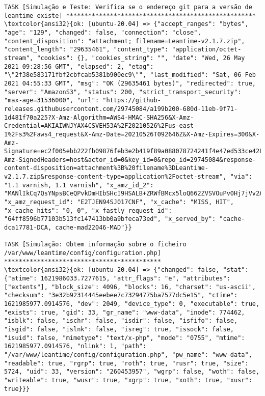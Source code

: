 \documentclass{scrartcl}
\begin{document}
\begin{Verbatim}
TASK [Simulação e Teste: Verifica se o endereço git para a versão de leantime existe] ****************************************************
\textcolor{ansi32}{ok: [ubuntu-20.04] => {"accept_ranges": "bytes", "age": "129", "changed": false, "connection": "close", "content_disposition": "attachment; filename=Leantime-v2.1.7.zip", "content_length": "29635461", "content_type": "application/octet-stream", "cookies": {}, "cookies_string": "", "date": "Wed, 26 May 2021 09:28:56 GMT", "elapsed": 2, "etag": "\"2f38e583171fbf2cbfcab5381b900ec9\"", "last_modified": "Sat, 06 Feb 2021 04:55:33 GMT", "msg": "OK (29635461 bytes)", "redirected": true, "server": "AmazonS3", "status": 200, "strict_transport_security": "max-age=31536000", "url": "https://github-releases.githubusercontent.com/29745084/a199b200-680d-11eb-9f71-1d481f70a225?X-Amz-Algorithm=AWS4-HMAC-SHA256&X-Amz-Credential=AKIAIWNJYAX4CSVEH53A%2F20210526%2Fus-east-1%2Fs3%2Faws4_request&X-Amz-Date=20210526T092646Z&X-Amz-Expires=300&X-Amz-Signature=ec2f005ebb222fb09876feb3e2b419f89a088078724241f4e47ed533ce4281be&X-Amz-SignedHeaders=host&actor_id=0&key_id=0&repo_id=29745084&response-content-disposition=attachment%3B%20filename%3DLeantime-v2.1.7.zip&response-content-type=application%2Foctet-stream", "via": "1.1 varnish, 1.1 varnish", "x_amz_id_2": "MANlIkCq7QsYNpsBCeQPvkDmHIbSHcI9HSALB+ZRWfBMcx5loQ662ZVSVOuPv0Hj7jVv2Anm3wg=", "x_amz_request_id": "E2TJEN94SJ017CNF", "x_cache": "MISS, HIT", "x_cache_hits": "0, 0", "x_fastly_request_id": "64ff8596b77103b513fc147413bb0a9bfeca73ed", "x_served_by": "cache-dca17781-DCA, cache-mad22046-MAD"}}

TASK [Simulação: Obtem informação sobre o ficheiro /var/www/leantime/config/configuration.php] *******************************************
\textcolor{ansi32}{ok: [ubuntu-20.04] => {"changed": false, "stat": {"atime": 1621986033.7277615, "attr_flags": "e", "attributes": ["extents"], "block_size": 4096, "blocks": 16, "charset": "us-ascii", "checksum": "3e32b92314445eebee7c73294775ba7577dc5e15", "ctime": 1621985977.0914576, "dev": 2049, "device_type": 0, "executable": true, "exists": true, "gid": 33, "gr_name": "www-data", "inode": 774462, "isblk": false, "ischr": false, "isdir": false, "isfifo": false, "isgid": false, "islnk": false, "isreg": true, "issock": false, "isuid": false, "mimetype": "text/x-php", "mode": "0755", "mtime": 1621985977.0914576, "nlink": 1, "path": "/var/www/leantime/config/configuration.php", "pw_name": "www-data", "readable": true, "rgrp": true, "roth": true, "rusr": true, "size": 5724, "uid": 33, "version": "260453957", "wgrp": false, "woth": false, "writeable": true, "wusr": true, "xgrp": true, "xoth": true, "xusr": true}}}


\end{Verbatim}
\end{document}
